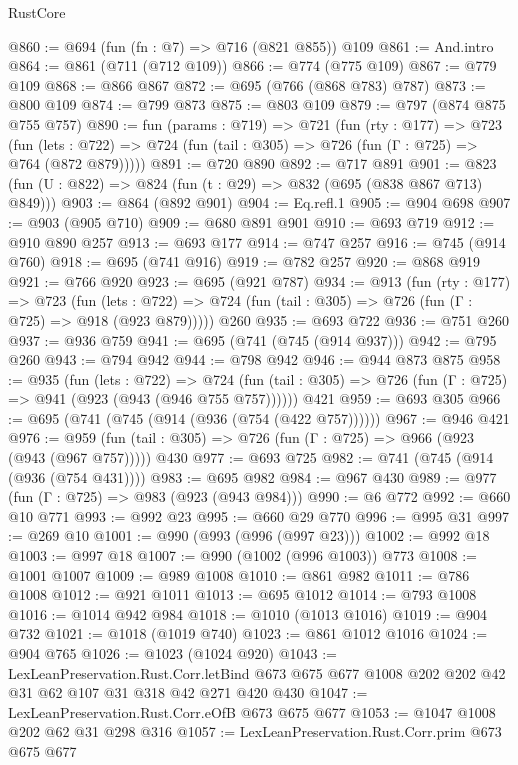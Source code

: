 \begin{lexlean}{RustCore}
\begin{coremodule}
@860 := @694 (fun (fn : @7) => @716 (@821 @855)) @109
@861 := And.intro
@864 := @861 (@711 (@712 @109))
@866 := @774 (@775 @109)
@867 := @779 @109
@868 := @866 @867
@872 := @695 (@766 (@868 @783) @787)
@873 := @800 @109
@874 := @799 @873
@875 := @803 @109
@879 := @797 (@874 @875 @755 @757)
@890 := fun (params : @719) =>
  @721
    (fun (rty : @177) =>
    @723
      (fun (lets : @722) => @724 (fun (tail : @305) => @726 (fun (Γ : @725) => @764 (@872 @879)))))
@891 := @720 @890
@892 := @717 @891
@901 := @823 (fun (U : @822) => @824 (fun (t : @29) => @832 (@695 (@838 @867 @713) @849)))
@903 := @864 (@892 @901)
@904 := Eq.refl.{1}
@905 := @904 @698
@907 := @903 (@905 @710)
@909 := @680 @891 @901
@910 := @693 @719
@912 := @910 @890 @257
@913 := @693 @177
@914 := @747 @257
@916 := @745 (@914 @760)
@918 := @695 (@741 @916)
@919 := @782 @257
@920 := @868 @919
@921 := @766 @920
@923 := @695 (@921 @787)
@934 := @913
    (fun (rty : @177) =>
    @723
      (fun (lets : @722) => @724 (fun (tail : @305) => @726 (fun (Γ : @725) => @918 (@923 @879)))))
    @260
@935 := @693 @722
@936 := @751 @260
@937 := @936 @759
@941 := @695 (@741 (@745 (@914 @937)))
@942 := @795 @260
@943 := @794 @942
@944 := @798 @942
@946 := @944 @873 @875
@958 := @935
    (fun (lets : @722) =>
    @724 (fun (tail : @305) => @726 (fun (Γ : @725) => @941 (@923 (@943 (@946 @755 @757))))))
    @421
@959 := @693 @305
@966 := @695 (@741 (@745 (@914 (@936 (@754 (@422 @757))))))
@967 := @946 @421
@976 := @959 (fun (tail : @305) => @726 (fun (Γ : @725) => @966 (@923 (@943 (@967 @757))))) @430
@977 := @693 @725
@982 := @741 (@745 (@914 (@936 (@754 @431))))
@983 := @695 @982
@984 := @967 @430
@989 := @977 (fun (Γ : @725) => @983 (@923 (@943 @984)))
@990 := @6 @772
@992 := @660 @10 @771
@993 := @992 @23
@995 := @660 @29 @770
@996 := @995 @31
@997 := @269 @10
@1001 := @990 (@993 (@996 (@997 @23)))
@1002 := @992 @18
@1003 := @997 @18
@1007 := @990 (@1002 (@996 @1003)) @773
@1008 := @1001 @1007
@1009 := @989 @1008
@1010 := @861 @982
@1011 := @786 @1008
@1012 := @921 @1011
@1013 := @695 @1012
@1014 := @793 @1008
@1016 := @1014 @942 @984
@1018 := @1010 (@1013 @1016)
@1019 := @904 @732
@1021 := @1018 (@1019 @740)
@1023 := @861 @1012 @1016
@1024 := @904 @765
@1026 := @1023 (@1024 @920)
@1043 := LexLeanPreservation.Rust.Corr.letBind
    @673
    @675
    @677
    @1008
    @202
    @202
    @42
    @31
    @62
    @107
    @31
    @318
    @42
    @271
    @420
    @430
@1047 := LexLeanPreservation.Rust.Corr.eOfB @673 @675 @677
@1053 := @1047 @1008 @202 @62 @31 @298 @316
@1057 := LexLeanPreservation.Rust.Corr.prim @673 @675 @677

\end{coremodule}
\end{lexlean}

